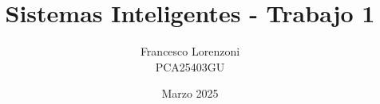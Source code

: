 
\usepackage[utf8]{inputenc} 
\usepackage{listingsutf8}
\usepackage[spanish]{babel}
\lstset{inputencoding=utf8/latin1}

\title{Sistemas Inteligentes - Trabajo 1}
\author{Francesco Lorenzoni\\\textsc{PCA25403GU}}
\date{Marzo 2025}


\makeatletter
\renewcommand{\l@section}{\@dottedtocline{1}{1.5em}{2.6em}}
\renewcommand{\l@subsection}{\@dottedtocline{2}{2.5em}{3.6em}}
\renewcommand{\l@subsubsection}{\@dottedtocline{3}{3.5em}{4.5em}}
\makeatother
{} %



\doparttoc[n]



\tableofcontents



